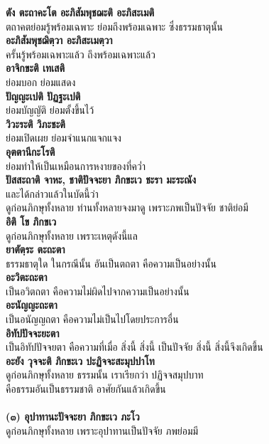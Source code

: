 \documentclass[12pt]{article}
\begin{document}
\textbf{ตัง ตะถาคะโต อะภิสัมพุชฌะติ อะภิสะเมติ}\\
\indent ตถาคตย่อมรู้พร้อมเฉพาะ ย่อมถึงพร้อมเฉพาะ ซึ่งธรรมธาตุนั้น\\
\textbf{อะภิสัมพุชฌิตฺวา อะภิสะเมตฺวา}\\
\indent ครั้นรู้พร้อมเฉพาะแล้ว ถึงพร้อมเฉพาะแล้ว\\
\textbf{อาจิกขะติ เทเสติ}\\
\indent ย่อมบอก ย่อมแสดง\\
\textbf{ปัญญะเปติ ปัฏฐะเปติ}\\
\indent ย่อมบัญญัติ ย่อมตั้งขึ้นไว้\\
\textbf{วิวะระติ วิภะชะติ}\\
\indent ย่อมเปิดเผย ย่อมจำแนกแจกแจง\\
\textbf{อุตตานีกะโรติ}\\
\indent ย่อมทำให้เป็นเหมือนการหงายของที่คว่ำ\\
\textbf{ปัสสะถาติ จาหะ, ชาติปัจจะยา ภิกขะเว ชะรา มะระณัง}\\
\indent และได้กล่าวแล้วในบัดนี้ว่า \\
\indent ดูก่อนภิกษุทั้งหลาย ท่านทั้งหลายจงมาดู เพราะภพเป็นปัจจัย ชาติย่อมี\\
\textbf{อิติ โข ภิกขเว}\\
\indent ดูก่อนภิกษุทั้งหลาย เพราะเหตุดังนี้แล\\
\textbf{ยาตัตฺระ ตะถะตา}\\
\indent ธรรมธาตุใด ในกรณีนั้น อันเป็นตถตา คือความเป็นอย่างนั้น\\
\textbf{อะวิตะถะตา}\\
\indent เป็นอวิตถตา คือความไม่ผิดไปจากความเป็นอย่างนั้น\\
\textbf{อะนัญญะถะตา}\\
\indent เป็นอนัญญถตา คือความไม่เป็นไปโดยประการอื่น\\
\textbf{อิทัปปัจจะยะตา}\\
\indent เป็นอิทัปปัจจยตา คือความที่เมื่อ สิ่งนี้ สิ่งนี้ เป็นปัจจัย สิ่งนี้ สิ่งนี้จึงเกิดขึ้น\\
\textbf{อะยัง วุจจะติ ภิกขะเว ปะฏิจจะสะมุปปาโท}\\
\indent ดูก่อนภิกษุทั้งหลาย ธรรมนั้น เราเรียกว่า ปฏิจจสมุปบาท \\
\indent คือธรรมอันเป็นธรรมชาติ อาศัยกันแล้วเกิดขึ้น\\
\\
\textbf{(๓) อุปาทานะปัจจะยา ภิกขะเว ภะโว}\\
\indent ดูก่อนภิกษุทั้งหลาย เพราะอุปาทานเป็นปัจจัย ภพย่อมมี\\
\end{document}
